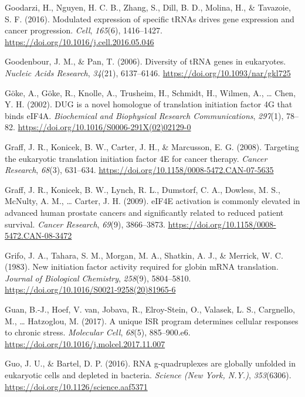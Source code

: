\documentclass[12pt,openany]{book}
\begin{document}
\hypertarget{ref-Goodarzi2016}{}
Goodarzi, H., Nguyen, H. C. B., Zhang, S., Dill, B. D., Molina, H., \&
Tavazoie, S. F. (2016). Modulated expression of specific tRNAs drives
gene expression and cancer progression. \emph{Cell}, \emph{165}(6),
1416--1427. \url{https://doi.org/10.1016/j.cell.2016.05.046}

\hypertarget{ref-Goodenbour2006}{}
Goodenbour, J. M., \& Pan, T. (2006). Diversity of tRNA genes in
eukaryotes. \emph{Nucleic Acids Research}, \emph{34}(21), 6137--6146.
\url{https://doi.org/10.1093/nar/gkl725}

\hypertarget{ref-Goke2002}{}
Göke, A., Göke, R., Knolle, A., Trusheim, H., Schmidt, H., Wilmen, A.,
\ldots{} Chen, Y. H. (2002). DUG is a novel homologue of translation
initiation factor 4G that binds eIF4A. \emph{Biochemical and Biophysical
Research Communications}, \emph{297}(1), 78--82.
\url{https://doi.org/10.1016/S0006-291X(02)02129-0}

\hypertarget{ref-Graff2008}{}
Graff, J. R., Konicek, B. W., Carter, J. H., \& Marcusson, E. G. (2008).
Targeting the eukaryotic translation initiation factor 4E for cancer
therapy. \emph{Cancer Research}, \emph{68}(3), 631--634.
\url{https://doi.org/10.1158/0008-5472.CAN-07-5635}

\hypertarget{ref-Graff2009}{}
Graff, J. R., Konicek, B. W., Lynch, R. L., Dumstorf, C. A., Dowless, M.
S., McNulty, A. M., \ldots{} Carter, J. H. (2009). eIF4E activation is
commonly elevated in advanced human prostate cancers and significantly
related to reduced patient survival. \emph{Cancer Research},
\emph{69}(9), 3866--3873.
\url{https://doi.org/10.1158/0008-5472.CAN-08-3472}

\hypertarget{ref-Grifo1983}{}
Grifo, J. A., Tahara, S. M., Morgan, M. A., Shatkin, A. J., \& Merrick,
W. C. (1983). New initiation factor activity required for globin mRNA
translation. \emph{Journal of Biological Chemistry}, \emph{258}(9),
5804--5810. \url{https://doi.org/10.1016/S0021-9258(20)81965-6}

\hypertarget{ref-Guan2017}{}
Guan, B.-J., Hoef, V. van, Jobava, R., Elroy-Stein, O., Valasek, L. S.,
Cargnello, M., \ldots{} Hatzoglou, M. (2017). A unique ISR program
determines cellular responses to chronic stress. \emph{Molecular Cell},
\emph{68}(5), 885--900.e6.
\url{https://doi.org/10.1016/j.molcel.2017.11.007}

\hypertarget{ref-Guo2016}{}
Guo, J. U., \& Bartel, D. P. (2016). RNA g-quadruplexes are globally
unfolded in eukaryotic cells and depleted in bacteria. \emph{Science
(New York, N.Y.)}, \emph{353}(6306).
\url{https://doi.org/10.1126/science.aaf5371}
\end{document}
